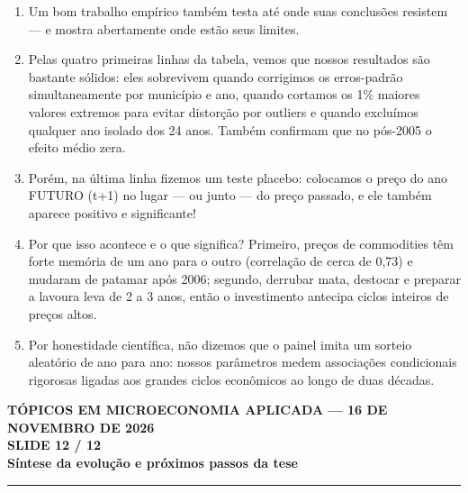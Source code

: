 \documentclass[11pt,a4paper]{article}
\newcommand{\slidenum}{1}
\begin{document}
\vspace{1mm}
\begin{enumerate}[leftmargin=*,label=\textbf{(\arabic*)},itemsep=2.6mm,topsep=1mm]
    \item Um bom trabalho empírico também testa até onde suas conclusões resistem — e mostra abertamente onde estão seus limites.
    \item Pelas quatro primeiras linhas da tabela, vemos que nossos resultados são bastante sólidos: eles sobrevivem quando corrigimos os erros-padrão simultaneamente por município e ano, quando cortamos os 1\% maiores valores extremos para evitar distorção por outliers e quando excluímos qualquer ano isolado dos 24 anos. Também confirmam que no pós-2005 o efeito médio zera.
    \item Porém, na última linha fizemos um teste placebo: colocamos o preço do ano FUTURO (t+1) no lugar — ou junto — do preço passado, e ele também aparece positivo e significante!
    \item Por que isso acontece e o que significa? Primeiro, preços de commodities têm forte memória de um ano para o outro (correlação de cerca de 0,73) e mudaram de patamar após 2006; segundo, derrubar mata, destocar e preparar a lavoura leva de 2 a 3 anos, então o investimento antecipa ciclos inteiros de preços altos.
    \item Por honestidade científica, não dizemos que o painel imita um sorteio aleatório de ano para ano: nossos parâmetros medem associações condicionais rigorosas ligadas aos grandes ciclos econômicos ao longo de duas décadas.
\end{enumerate}

\newpage

\renewcommand{\slidenum}{12}
\noindent
\begin{minipage}{\textwidth}
\begin{center}
{\color{cinza}\footnotesize\textbf{TÓPICOS EM MICROECONOMIA APLICADA --- 16 DE NOVEMBRO DE 2026}\\[1.2mm]}
{\color{cinza}\bfseries\Large SLIDE 12 / 12\\[1.5mm]}
{\color{verde}\bfseries\LARGE Síntese da evolução e próximos passos da tese\\[2.5mm]}
\rule{\textwidth}{1pt}
\end{center}
\end{minipage}
\vspace{1.5mm}
\end{document}

